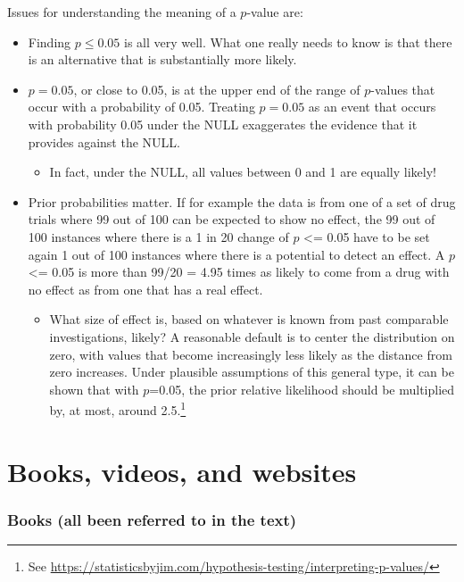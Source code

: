 \documentclass[
  10ptls,
  b5paper]{book}
\providecommand{\tightlist}{%
  \setlength{\itemsep}{0pt}\setlength{\parskip}{0pt}}
\begin{document}
Issues for understanding the meaning of a \(p\)-value are:

\begin{itemize}
\tightlist
\item
  Finding \(p \leq 0.05\) is all very well. What one really needs to know is that there is an alternative that is substantially more likely.
\item
  \(p = 0.05\), or close to 0.05, is at the upper end of the range of \(p\)-values that occur with a probability of 0.05. Treating \(p = 0.05\) as an event that occurs with probability 0.05 under the NULL exaggerates the evidence that it provides against the NULL.

  \begin{itemize}
  \tightlist
  \item
    In fact, under the NULL, all values between 0 and 1 are equally likely!
  \end{itemize}
\item
  Prior probabilities matter. If for example the data is from one of a set of drug trials where 99 out of 100 can be expected to show no effect, the 99 out of 100 instances where there is a 1 in 20 change of \(p\) \textless= 0.05 have to be set again 1 out of 100 instances where there is a potential to detect an effect. A \(p\) \textless= 0.05 is more than 99/20 = 4.95 times as likely to come from a drug with no effect as from one that has a real effect.

  \begin{itemize}
  \tightlist
  \item
    What size of effect is, based on whatever is known from past comparable investigations, likely? A reasonable default is to center the distribution on zero, with values that become increasingly less likely as the distance from zero increases. Under plausible assumptions of this general type, it can be shown that with \(p\)=0.05, the prior relative likelihood should be multiplied by, at most, around 2.5.\footnote{See \url{https://statisticsbyjim.com/hypothesis-testing/interpreting-p-values/}}
  \end{itemize}
\end{itemize}

\backmatter

\chapter{Books, videos, and websites}\label{app:more}

\subsection{Books (all been referred to in the text)}\label{books-all-been-referred-to-in-the-text}
\end{document}
